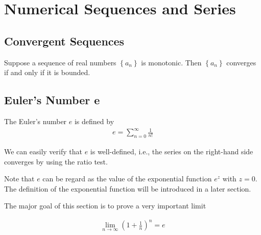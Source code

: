 \documentclass[thmcnt=section, 12pt]{elegantbook}
\begin{document}
\chapter{Numerical Sequences and Series}


\section{Convergent Sequences}


\begin{theorem} \label{thm:23}
    Suppose a sequence of real numbers $\left\{a_n\right\}$ is monotonic. Then $\left\{a_n\right\}$ converges if and only if it is bounded. 
\end{theorem}


\section{Euler's Number e}


\begin{definition}
    The Euler's number $e$ is defined by
    \begin{align*}
        e = \sum_{n=0}^{\infty} \frac{1}{n!}
    \end{align*}
\end{definition}

\begin{remark}
    We can easily verify that $e$ is well-defined, i.e., the series on the right-hand side converges by using the ratio test.
\end{remark}

\par Note that $e$ can be regard as the value of the exponential function $e^z$ with $z = 0$. The definition of the exponential function will be introduced in a later section.


\par The major goal of this section is to prove a very important limit 

\begin{align*}
    \lim_{n \to \infty} \left( 1 + \frac{1}{n} \right)^n = e
\end{align*}
\end{document}
